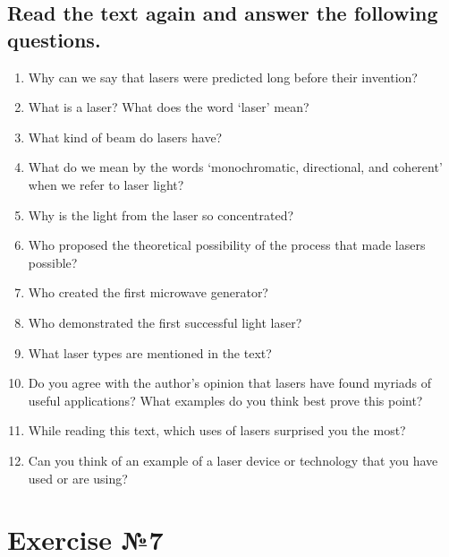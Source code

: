 \subsection*{Read the text again and answer the following questions.}
\begin{enumerate}
      \item Why can we say that lasers were predicted long before their invention?
      \item What is a laser? What does the word ‘laser’ mean?
      \item What kind of beam do lasers have?
      \item What do we mean by the words ‘monochromatic, directional, and coherent’
            when we refer to laser light?
      \item Why is the light from the laser so concentrated?
      \item Who proposed the theoretical possibility of the process that made lasers
            possible?
      \item Who created the first microwave generator?
      \item Who demonstrated the first successful light laser?
      \item What laser types are mentioned in the text?
      \item Do you agree with the author’s opinion that lasers have found myriads
            of useful applications? What examples do you think best prove this point?
      \item While reading this text, which uses of lasers surprised you the most?
      \item Can you think of an example of a laser device or technology that you
            have used or are using?
\end{enumerate}

\section*{Exercise №7}
\allocation{[Устно]}

